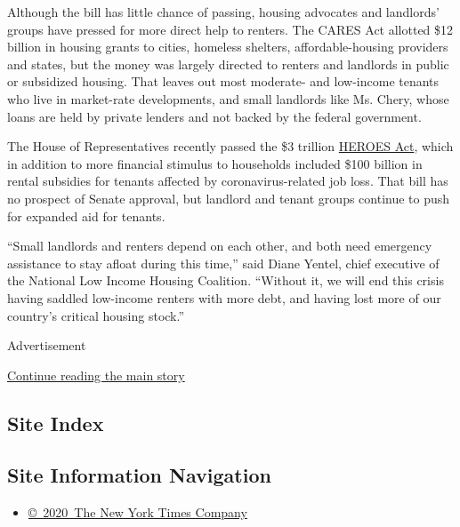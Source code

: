 Although the bill has little chance of passing, housing advocates and
landlords' groups have pressed for more direct help to renters. The
CARES Act allotted \$12 billion in housing grants to cities, homeless
shelters, affordable-housing providers and states, but the money was
largely directed to renters and landlords in public or subsidized
housing. That leaves out most moderate- and low-income tenants who live
in market-rate developments, and small landlords like Ms. Chery, whose
loans are held by private lenders and not backed by the federal
government.

The House of Representatives recently passed the \$3 trillion
\href{https://www.congress.gov/bill/116th-congress/house-bill/6800/text}{HEROES
Act}, which in addition to more financial stimulus to households
included \$100 billion in rental subsidies for tenants affected by
coronavirus-related job loss. That bill has no prospect of Senate
approval, but landlord and tenant groups continue to push for expanded
aid for tenants.

``Small landlords and renters depend on each other, and both need
emergency assistance to stay afloat during this time,'' said Diane
Yentel, chief executive of the National Low Income Housing Coalition.
``Without it, we will end this crisis having saddled low-income renters
with more debt, and having lost more of our country's critical housing
stock.''

Advertisement

\protect\hyperlink{after-bottom}{Continue reading the main story}

\hypertarget{site-index}{%
\subsection{Site Index}\label{site-index}}

\hypertarget{site-information-navigation}{%
\subsection{Site Information
Navigation}\label{site-information-navigation}}

\begin{itemize}
\tightlist
\item
  \href{https://help.nytimes.com/hc/en-us/articles/115014792127-Copyright-notice}{©~2020~The
  New York Times Company}
\end{itemize}

